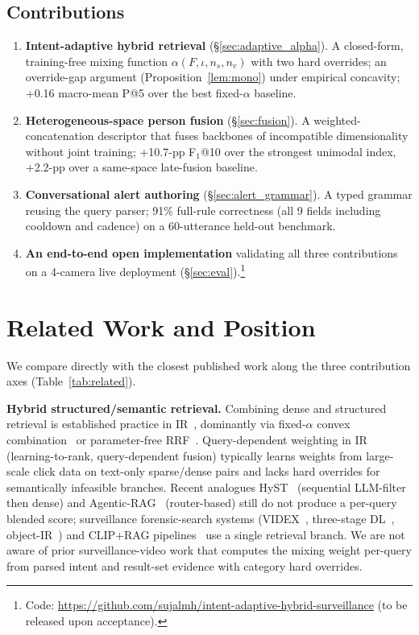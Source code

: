 ﻿\documentclass[conference]{IEEEtran}
\theoremstyle{definition}
\begin{document}
\subsection*{Contributions}
\begin{enumerate}
\item \textbf{Intent-adaptive hybrid retrieval} (\S\ref{sec:adaptive_alpha}). A closed-form, training-free mixing function $\alpha(F,\iota,n_s,n_v)$ with two hard overrides; an override-gap argument (Proposition~\ref{lem:mono}) under empirical concavity; +0.16 macro-mean P@5 over the best fixed-$\alpha$ baseline.
\item \textbf{Heterogeneous-space person fusion} (\S\ref{sec:fusion}). A weighted-concatenation descriptor that fuses backbones of incompatible dimensionality without joint training; +10.7-pp F$_1$@10 over the strongest unimodal index, +2.2-pp over a same-space late-fusion baseline.
\item \textbf{Conversational alert authoring} (\S\ref{sec:alert_grammar}). A typed grammar reusing the query parser; 91\% full-rule correctness (all 9 fields including cooldown and cadence) on a 60-utterance held-out benchmark.
\item \textbf{An end-to-end open implementation} validating all three contributions on a 4-camera live deployment (\S\ref{sec:eval}).\footnote{Code: \url{https://github.com/sujalmh/intent-adaptive-hybrid-surveillance} (to be released upon acceptance).}
\end{enumerate}

\section{Related Work and Position}

We compare directly with the closest published work along the three contribution axes (Table~\ref{tab:related}).

\textbf{Hybrid structured/semantic retrieval.} Combining dense and structured retrieval is established practice in IR~\cite{b25,b27,b29}, dominantly via fixed-$\alpha$ convex combination~\cite{b29} or parameter-free RRF~\cite{b27}. Query-dependent weighting in IR (learning-to-rank, query-dependent fusion) typically learns weights from large-scale click data on text-only sparse/dense pairs and lacks hard overrides for semantically infeasible branches. Recent analogues HyST~\cite{b30} (sequential LLM-filter then dense) and Agentic-RAG~\cite{b3} (router-based) still do not produce a per-query blended score; surveillance forensic-search systems (VIDEX~\cite{b7}, three-stage DL~\cite{b12}, object-IR~\cite{b11}) and CLIP+RAG pipelines~\cite{b1,b19} use a single retrieval branch. We are not aware of prior surveillance-video work that computes the mixing weight per-query from parsed intent and result-set evidence with category hard overrides.
\end{document}
